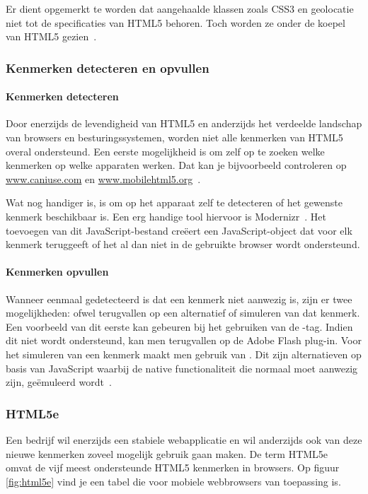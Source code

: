Er dient opgemerkt te worden dat aangehaalde klassen zoals CSS3 en geolocatie niet tot de specificaties van HTML5 behoren. Toch worden ze onder de koepel van HTML5 gezien~\cite{MacDonald2011}.

\subsubsection{Kenmerken detecteren en opvullen}
\paragraph{Kenmerken detecteren}
Door enerzijds de levendigheid van HTML5 en anderzijds het verdeelde landschap van browsers en besturingssystemen, worden niet alle kenmerken van HTML5 overal ondersteund. Een eerste mogelijkheid is om zelf op te zoeken welke kenmerken op welke apparaten werken. Dat kan je bijvoorbeeld controleren op \url{www.caniuse.com} en \url{www.mobilehtml5.org}~\cite{MacDonald2011}. 

Wat nog handiger is, is om op het apparaat zelf te detecteren of het gewenste kenmerk beschikbaar is. Een erg handige tool hiervoor is Modernizr~\cite{Modernizr2012}. Het toevoegen van dit JavaScript-bestand creëert een JavaScript-object dat voor elk kenmerk teruggeeft of het al dan niet in de gebruikte browser wordt ondersteund.

\paragraph{Kenmerken opvullen}
Wanneer eenmaal gedetecteerd is dat een kenmerk niet aanwezig is, zijn er twee mogelijkheden: ofwel terugvallen op een alternatief of simuleren van dat kenmerk. Een voorbeeld van dit eerste kan gebeuren bij het gebruiken van de -tag. Indien dit niet wordt ondersteund, kan men terugvallen op de Adobe Flash plug-in. Voor het simuleren van een kenmerk maakt men gebruik van . Dit zijn alternatieven op basis van JavaScript waarbij de native functionaliteit die normaal moet aanwezig zijn, geëmuleerd wordt~\cite{MacDonald2011,Weyl2011}.

\subsubsection{HTML5e}
Een bedrijf wil enerzijds een stabiele webapplicatie en wil anderzijds ook van deze nieuwe kenmerken zoveel mogelijk gebruik gaan maken. De term HTML5e~\cite{Hales2012} omvat de vijf meest ondersteunde HTML5 kenmerken in browsers. Op figuur \ref{fig:html5e} vind je een tabel die voor mobiele webbrowsers van toepassing is.

